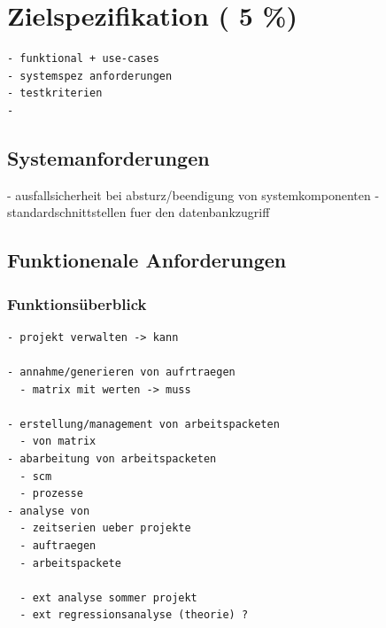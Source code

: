 \chapter{Zielspezifikation ( 5 \%)}












\begin{verbatim}
- funktional + use-cases
- systemspez anforderungen
- testkriterien
-
\end{verbatim}


\section{Systemanforderungen}

- ausfallsicherheit bei absturz/beendigung
  von systemkomponenten
- standardschnittstellen fuer den datenbankzugriff

\section{Funktionenale Anforderungen}
\subsection{Funktions\"uberblick}
\begin{verbatim}
- projekt verwalten -> kann

- annahme/generieren von aufrtraegen
  - matrix mit werten -> muss

- erstellung/management von arbeitspacketen
  - von matrix
- abarbeitung von arbeitspacketen
  - scm
  - prozesse
- analyse von
  - zeitserien ueber projekte
  - auftraegen
  - arbeitspackete

  - ext analyse sommer projekt
  - ext regressionsanalyse (theorie) ?
\end{verbatim}

